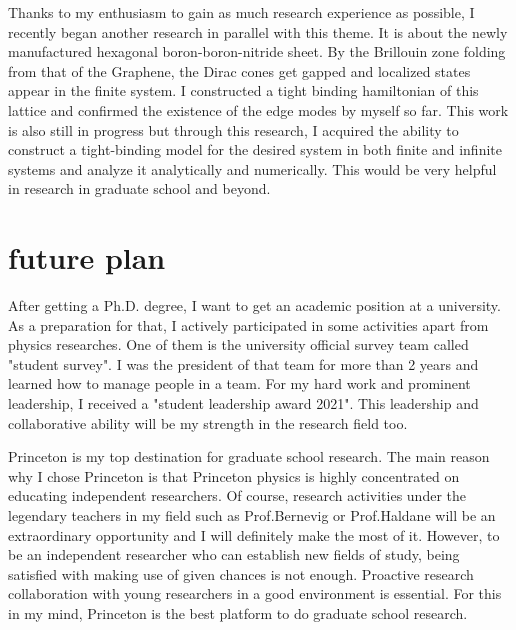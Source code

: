 \documentclass[a4]{article}
\begin{document}
Thanks to my enthusiasm to gain as much research experience as possible, I recently began another research in parallel with this theme. It is about the newly manufactured hexagonal boron-boron-nitride sheet. By the Brillouin zone folding from that of the Graphene, the Dirac cones get gapped and localized states appear in the finite system. I constructed a tight binding hamiltonian of this lattice and confirmed the existence of the edge modes by myself so far. This work is also still in progress but through this research, I acquired the ability to construct a tight-binding model for the desired system in both finite and infinite systems and analyze it analytically and numerically. This would be very helpful in research in graduate school and beyond.\par


\section{future plan}
After getting a Ph.D. degree, I want to get an academic position at a university. As a preparation for that, I actively participated in some activities apart from physics researches. One of them is the university official survey team called "student survey". I was the president of that team for more than 2 years and learned how to manage people in a team. For my hard work and prominent leadership, I received a "student leadership award 2021". This leadership and collaborative ability will be my strength in the research field too.\par

Princeton is my top destination for graduate school research. The main reason why I chose Princeton is that Princeton physics is highly concentrated on educating independent researchers. Of course, research activities under the legendary teachers in my field such as Prof.Bernevig or Prof.Haldane will be an extraordinary opportunity and I will definitely make the most of it. However, to be an independent researcher who can establish new fields of study, being satisfied with making use of given chances is not enough. Proactive research collaboration with young researchers in a good environment is essential. For this in my mind, Princeton is the best platform to do graduate school research.
\end{document}

